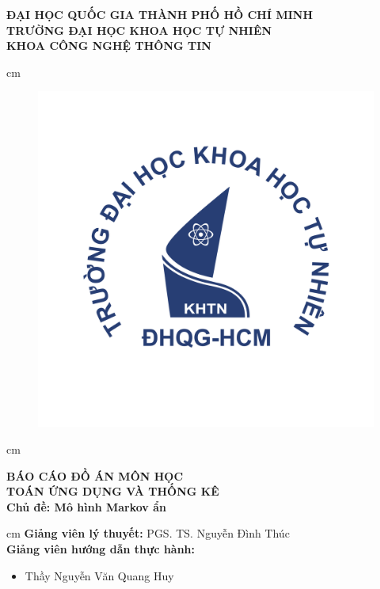 \begin{titlepage}
\begin{mybox}
\begin{center}
\fontsize{12}{12}\selectfont
\textbf{ĐẠI HỌC QUỐC GIA THÀNH PHỐ HỒ CHÍ MINH}\\
\textbf{TRƯỜNG ĐẠI HỌC KHOA HỌC TỰ NHIÊN}\\
\textbf{KHOA CÔNG NGHỆ THÔNG TIN}
\end{center}
 cm
\begin{figure}[H]
\begin{center}
\includegraphics[scale=0.25]{../figures/logo}
\end{center}
\end{figure}
 cm
\begin{center}
\fontsize{18}{14}\selectfont
\textbf{BÁO CÁO ĐỒ ÁN MÔN HỌC}\\
\fontsize{24}{16}\selectfont
\textbf{TOÁN ỨNG DỤNG VÀ THỐNG KÊ}\\
\fontsize{18}{12}\selectfont
\textbf{Chủ đề: Mô hình Markov ẩn}
\end{center}
 cm
\fontsize{14}{12}\selectfont
\textbf{Giảng viên lý thuyết:} PGS. TS. Nguyễn Đình Thúc\\
\textbf{Giảng viên hướng dẫn thực hành:}
\begin{itemize}
\item Thầy Nguyễn Văn Quang Huy

\end{itemize}
\end{mybox}
\end{titlepage}
